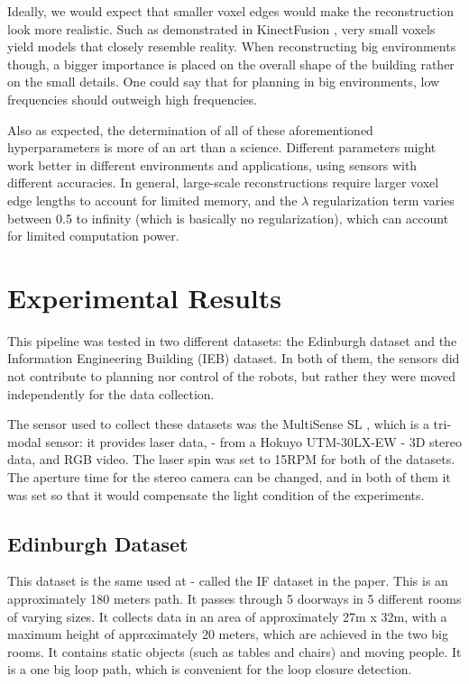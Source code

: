 \documentclass[12pt]{article}
\begin{document}
Ideally, we would expect that smaller voxel edges would make the reconstruction look more realistic. Such as demonstrated in KinectFusion \cite{kinectfusion}, very small voxels yield models that closely resemble reality. When reconstructing big environments though, a bigger importance is placed on the overall shape of the building rather on the small details. One could say that for planning in big environments, low frequencies should outweigh high frequencies. 

Also as expected, the determination of all of these aforementioned hyperparameters is more of an art than a science. Different parameters might work better in different environments and applications, using sensors with different accuracies. In general, large-scale reconstructions require larger voxel edge lengths to account for limited memory, and the $\lambda$ regularization term varies between 0.5 to infinity (which is basically no regularization), which can account for limited computation power.
			
	\newpage
	\section{Experimental Results}
	\label{subs:experiments}

This pipeline was tested in two different datasets: the Edinburgh dataset and the Information Engineering Building (IEB) dataset. In both of them, the sensors did not contribute to planning nor control of the robots, but rather they were moved independently for the data collection.
	
The sensor used to collect these datasets was the MultiSense SL \cite{multisense}, which is a tri-modal sensor: it provides laser data, - from a Hokuyo UTM-30LX-EW - 3D stereo data, and RGB video. The laser spin was set to 15RPM for both of the datasets. The aperture time for the stereo camera can be changed, and in both of them it was set so that it would compensate the light condition of the experiments. 
	
	\subsection{Edinburgh Dataset}

This dataset is the same used at \cite{AICPAlign} - called the IF dataset in the paper. This is an approximately 180 meters path. It passes through 5 doorways in 5 different rooms of varying sizes. It collects data in an area of approximately 27m x 32m, with a maximum height of approximately 20 meters, which are achieved in the two big rooms. It contains static objects (such as tables and chairs) and moving people. It is a one big loop path, which is convenient for the loop closure detection.
	
\end{document}
